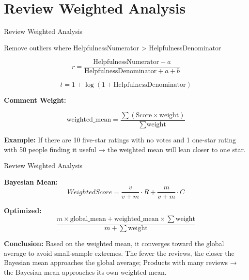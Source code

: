 \section{Review Weighted Analysis}

\begin{frame}{Review Weighted Analysis}

	Remove outliers where HelpfulnessNumerator > HelpfulnessDenominator

	\vspace{-15pt}
	\begin{figure}[htbp]
		\centering
		\begin{minipage}[t]{0.50\textwidth}
			\vspace{0pt}
			\centering
			\[
			r = \frac{\text{HelpfulnessNumerator} + a}
					{\text{HelpfulnessDenominator} + a + b}
			\]
		\end{minipage}
		\hfill
		\begin{minipage}[t]{0.49\textwidth}
			\vspace{0pt}
			\centering
			\[
			t = 1 + \log(1 + \text{HelpfulnessDenominator})
			\]
		\end{minipage}
	\end{figure}

	\vspace{10pt}
	\textbf{Comment Weight:}

	\[
	\text{weighted\_mean} =
	\frac{\sum (\text{Score} \times \text{weight})}
		{\sum \text{weight}}
	\]

	
	\vspace{10pt}
    \textbf{Example:} If there are 10 five-star ratings with no votes and 1 one-star rating with 50 people finding it useful → the weighted mean will lean closer to one star.

\end{frame}



\begin{frame}{Review Weighted Analysis}

	\textbf{Bayesian Mean:}
	\[
	WeightedScore = \frac{v}{v + m} \cdot R + \frac{m}{v + m} \cdot C
	\]

	\vspace{10pt}

	\textbf{Optimized:}
	\[
	\frac{m \times \text{global\_mean} + \text{weighted\_mean} \times \sum \text{weight}}
		{m + \sum \text{weight}}
	\]

	\vspace{10pt}

    \textbf{Conclusion:} Based on the weighted mean, it converges toward the global average to avoid small-sample extremes. The fewer the reviews, the closer the Bayesian mean approaches the global average; Products with many reviews → the Bayesian mean approaches its own weighted mean.

\end{frame}



